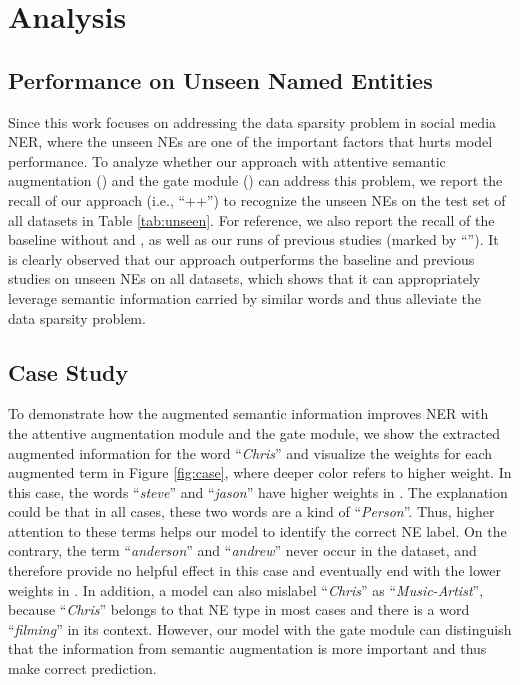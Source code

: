 \documentclass[11pt,a4paper]{article}
\begin{document}
\section{Analysis}



\subsection{Performance on Unseen Named Entities}





Since this work focuses on addressing the data sparsity problem in social media NER, where the unseen NEs
are one of the important factors that hurts model performance.
To analyze whether our approach with attentive semantic augmentation () and the gate module () can address this problem, we report the recall of our approach (i.e., ``++'') to recognize the unseen NEs on the test set of all datasets in Table \ref{tab:unseen}.
For reference, we also report the recall of the baseline without  and , as well as our runs of previous studies (marked by ``'').
It is clearly observed that our approach outperforms the baseline and previous studies on unseen NEs on all datasets, which shows that it can appropriately leverage semantic information carried by similar words and thus alleviate the data sparsity problem. 





\subsection{Case Study}


To demonstrate how the augmented semantic information improves NER with the attentive augmentation module and the gate module, 
we show the extracted augmented information for the word ``\textit{Chris}'' and visualize the weights for each augmented term in
Figure \ref{fig:case}, where deeper color refers to higher weight.
In this case, the words ``\textit{steve}'' and ``\textit{jason}'' have higher weights in .
The explanation could be that in all cases, these two words are a kind of ``\textit{Person}''. 
Thus, higher attention to these terms helps our model to identify the correct NE label. 
On the contrary, the term ``\textit{anderson}'' and ``\textit{andrew}'' never occur in the dataset, and therefore provide no helpful effect in this case and eventually end with the lower weights in . 
In addition, a model can also mislabel ``\textit{Chris}'' as ``\textit{Music-Artist}'', because ``\textit{Chris}'' belongs to that NE type in most cases and there is a word ``\textit{filming}'' in its context.
However, our model with the gate module can distinguish that the information from semantic augmentation is more important and thus make correct prediction.
\end{document}
